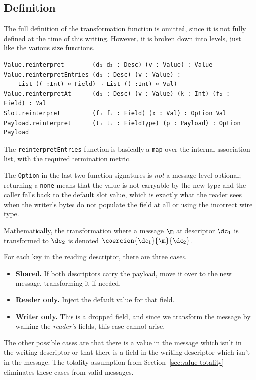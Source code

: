 \subsection{Definition}

The full definition of the transformation function is omitted, since it is not
fully defined at the time of this writing. However, it is broken down into
levels, just like the various size functions.

\begin{verbatim}
Value.reinterpret        (d₁ d₂ : Desc) (v : Value) : Value
Value.reinterpretEntries (d₁ : Desc) (v : Value) :
    List ((_:Int) × Field) → List ((_:Int) × Val)
Value.reinterpretAt      (d₁ : Desc) (v : Value) (k : Int) (f₂ : Field) : Val
Slot.reinterpret         (f₁ f₂ : Field) (x : Val) : Option Val
Payload.reinterpret      (t₁ t₂ : FieldType) (p : Payload) : Option Payload
\end{verbatim}

The \texttt{reinterpretEntries} function is basically a \texttt{map} over the
internal association list, with the required termination metric.

The \texttt{Option} in the last two function signatures is \emph{not} a
message-level optional; returning a \texttt{none} means that the value is not
carryable by the new type and the caller falls back to the default slot value,
which is exactly what the reader sees when the writer's bytes do not populate
the field at all or using the incorrect wire type.

Mathematically, the transformation where a message $\m$ at descriptor $\dc_1$ is
transformed to $\dc_2$ is denoted $\coercion{\dc_1}{\m}{\dc_2}$.

For each key in the reading descriptor, there are three cases.

\begin{itemize}
\item \textbf{Shared.} If both descriptors carry the payload, move it over to
  the new message, transforming it if needed.
\item \textbf{Reader only.} Inject the default value for that field.
\item \textbf{Writer only.} This is a dropped field, and since we transform the
  message by walking the \emph{reader's} fields, this case cannot arise.
\end{itemize}

The other possible cases are that there is a value in the message which isn't in
the writing descriptor or that there is a field in the writing descriptor which
isn't in the message. The totality assumption from
Section~\ref{sec:value-totality} eliminates these cases from valid messages.

